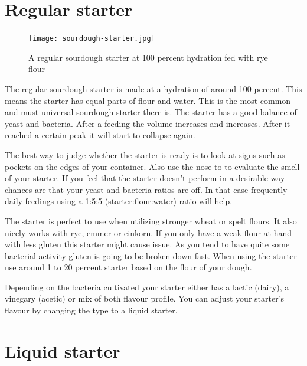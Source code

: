 \section{Regular starter}

\begin{figure}[!htb]
  \texttt{[image: sourdough-starter.jpg]}
  \caption{A regular sourdough starter at 100 percent hydration fed with rye flour}
  \label{fig:regular-sourdough-starter}
\end{figure}

The regular sourdough starter is made at a hydration of around 100 percent.
This means the starter has equal parts of flour and water. This is the most
common and must universal sourdough starter there is. The starter has a good
balance of yeast and bacteria. After a feeding the volume increases and
increases. After it reached a certain peak it will start to collapse again.

The best way to judge whether the starter is ready is to look at signs such as
pockets on the edges of your container. Also use the nose to to evaluate the
smell of your starter. If you feel that the starter doesn't perform in a
desirable way chances are that your yeast and bacteria ratios are off. In that
case frequently daily feedings using a 1:5:5 (starter:flour:water) ratio will
help.

The starter is perfect to use when utilizing stronger wheat or spelt flours.
It also nicely works with rye, emmer or einkorn. If you only have a weak flour
at hand with less gluten this starter might cause issue. As you tend to have
quite some bacterial activity gluten is going to be broken down fast. When
using the starter use around 1 to 20 percent starter based on the flour of your
dough.

Depending on the bacteria cultivated your starter either has a lactic (dairy),
a vinegary (acetic) or mix of both flavour profile. You can adjust your
starter's flavour by changing the type to a liquid starter.

\section{Liquid starter}
\label{section:liquid-starter}

